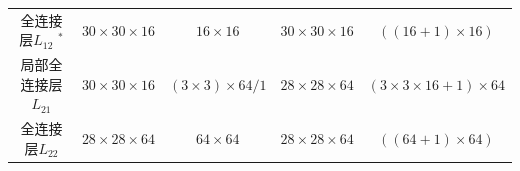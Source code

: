 \begin{longtable}[]{ ccccc }
\begin{minipage}[t]{0.11\columnwidth}
全连接层\(L_{12}\) \(^*\)\strut
\end{minipage} & \begin{minipage}[t]{0.12\columnwidth}\centering\strut
\(30\times30\times16\)\strut
\end{minipage} & \begin{minipage}[t]{0.11\columnwidth}\centering\strut
\(16\times16\)\strut
\end{minipage} & \begin{minipage}[t]{0.13\columnwidth}\centering\strut
\(30\times30\times16\)\strut
\end{minipage} & \begin{minipage}[t]{0.12\columnwidth}\centering\strut
\(((16+1)\times16)\)\strut
\end{minipage}\tabularnewline
\begin{minipage}[t]{0.11\columnwidth}\centering\strut
局部全连接层\(L_{21}\)\strut
\end{minipage} & \begin{minipage}[t]{0.12\columnwidth}\centering\strut
\(30\times30\times16\)\strut
\end{minipage} & \begin{minipage}[t]{0.11\columnwidth}\centering\strut
\((3\times3)\times64/1\)\strut
\end{minipage} & \begin{minipage}[t]{0.13\columnwidth}\centering\strut
\(28\times28\times64\)\strut
\end{minipage} & \begin{minipage}[t]{0.12\columnwidth}\centering\strut
\((3\times3\times16+1)\times64\)\strut
\end{minipage}\tabularnewline
\begin{minipage}[t]{0.11\columnwidth}\centering\strut
全连接层\(L_{22}\)\strut
\end{minipage} & \begin{minipage}[t]{0.12\columnwidth}\centering\strut
\(28\times28\times64\)\strut
\end{minipage} & \begin{minipage}[t]{0.11\columnwidth}\centering\strut
\(64\times64\)\strut
\end{minipage} & \begin{minipage}[t]{0.13\columnwidth}\centering\strut
\(28\times28\times64\)\strut
\end{minipage} & \begin{minipage}[t]{0.12\columnwidth}\centering\strut
\(((64+1)\times64)\)\strut
\end{minipage}\tabularnewline

\end{longtable}
